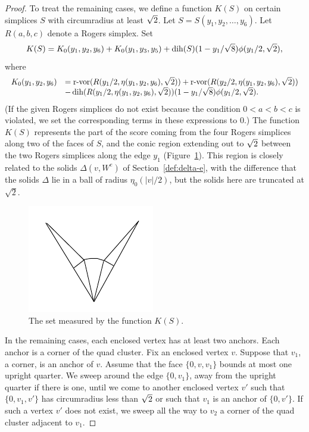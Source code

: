 \begin{proof}
To treat the remaining cases, we define a function $K(S)$ on
certain simplices $S$ with circumradius at least $\sqrt2$. Let
$S=S(y_1,y_2,\ldots,y_6)$.  Let $R(a,b,c)$ denote a Rogers
simplex. Set
    \begin{equation}
    K(S) = K_0(y_1,y_2,y_6)+K_0(y_1,y_3,y_5)
    + \operatorname{dih}(S)(1-y_1/\sqrt8) \phi(y_1/2,\sqrt2),
    \label{eqn:KS}
    \end{equation}
where
    $$
    \begin{array}{lll}
    K_0(y_1,y_2,y_6) &= {\operatorname{r-vor}}(R(y_1/2,\eta(y_1,y_2,y_6),\sqrt2))
        +{\operatorname{r-vor}}(R(y_2/2,\eta(y_1,y_2,y_6),\sqrt2))\\
        &- \operatorname{dih}(R(y_1/2,\eta(y_1,y_2,y_6),\sqrt2))
        (1-y_1/\sqrt8)\phi(y_1/2,\sqrt2).
    \end{array}
    $$
(If the given Rogers simplices do not exist because the condition
$0<a<b<c$ is violated, we set the corresponding terms in these
expressions to 0.) The function $K(S)$ represents the part of the
score coming from the four Rogers simplices along two of the faces
of $S$, and the conic region extending out to $\sqrt2$ between the
two Rogers simplices along the edge $y_1$ (Figure~\ref{fig:KS}).
This region is closely related to the solids $\Delta (v, W ^e)$ of
Section~\ref{def:delta-e}, with the difference that the solids
$\Delta$ lie in a ball of radius $\eta_0(|v|/2)$, but the solids
here are truncated at $\sqrt2$.

\begin{figure}[htb]
  \centering
  \includegraphics{PS/diag43.pdf}
  \caption{The set measured by the function $K(S)$.}
  \label{fig:KS}
\end{figure}

In the remaining cases, each enclosed vertex has at least two
anchors.  Each anchor is a corner of the quad cluster.  Fix an
enclosed vertex $v$. Suppose that $v_1$, a corner, is an anchor of
$v$. Assume that the face $\{0,v,v_1\}$ bounds at most one upright
quarter. We sweep around the edge $\{0,v_1\}$, away from the
upright quarter if there is one,  until we come to another
enclosed vertex $v'$ such that $\{0,v_1,v'\}$ has circumradius
less than $\sqrt2$ or such that $v_1$ is an anchor of $\{0,v'\}$.
If such a vertex $v'$ does not exist, we sweep all the way to
$v_2$ a corner of the quad cluster adjacent to $v_1$.


\end{proof}
